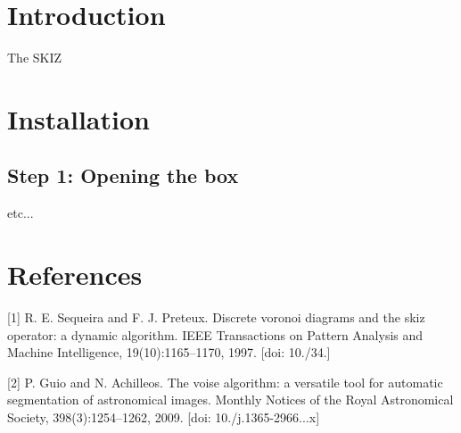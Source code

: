 \hypertarget{index_intro_sec}{}\section{Introduction}\label{index_intro_sec}
The S\+K\+IZ\hypertarget{index_install_sec}{}\section{Installation}\label{index_install_sec}
\hypertarget{index_step1}{}\subsection{Step 1\+: Opening the box}\label{index_step1}
etc...\hypertarget{index_references_sec}{}\section{References}\label{index_references_sec}
\mbox{[}1\mbox{]} R. E. Sequeira and F. J. Preteux. Discrete voronoi diagrams and the skiz operator\+: a dynamic algorithm. I\+E\+EE Transactions on Pattern Analysis and Machine Intelligence, 19(10)\+:1165–1170, 1997. \mbox{[}doi\+: 10./34.\mbox{]}

\mbox{[}2\mbox{]} P. Guio and N. Achilleos. The voise algorithm\+: a versatile tool for automatic segmentation of astronomical images. Monthly Notices of the Royal Astronomical Society, 398(3)\+:1254–1262, 2009. \mbox{[}doi\+: 10./j.1365-\/2966...\+x\mbox{]} 